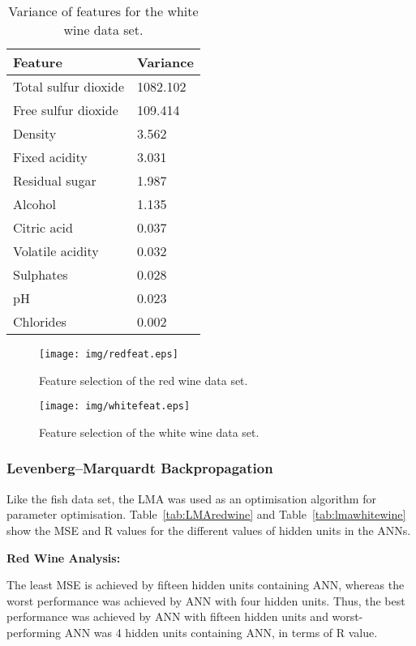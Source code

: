 \begin{table}[htbp]
    
    \centering
    \caption{Variance of features for the white wine data set.}
    \label{tab:whitewinevar}
    \begin{tabular}{|l|l|}
    \hline
         \textbf{Feature} & \textbf{Variance}\\ \hline
Total sulfur dioxide & 1082.102 \\ \hline
Free sulfur dioxide & 109.414 \\ \hline
Density & 3.562 \\ \hline
Fixed acidity  & 3.031 \\ \hline
Residual sugar & 1.987 \\ \hline
Alcohol & 1.135 \\ \hline
Citric acid  & 0.037 \\ \hline
Volatile acidity  & 0.032 \\ \hline
Sulphates & 0.028 \\ \hline
pH & 0.023 \\ \hline
Chlorides & 0.002 \\ \hline
    \end{tabular}
    
\end{table}

\begin{figure}[htbp]
  \centering
\texttt{[image: img/redfeat.eps]}
  \caption{Feature selection of the red wine data set.}
  \label{fig:redfeat}
\end{figure}

\begin{figure}[htbp]
  \centering
\texttt{[image: img/whitefeat.eps]}
  \caption{Feature selection of the white wine data set.}
  \label{fig:whitefeat}
\end{figure}

\subsubsection{Levenberg--Marquardt Backpropagation}

Like the fish data set, the LMA was used as an optimisation algorithm for parameter optimisation. Table~\ref{tab:LMAredwine} and Table~\ref{tab:lmawhitewine} show the MSE and R values for the different values of hidden units in the ANNs.

\textbf{Red Wine Analysis:}

The least MSE is achieved by fifteen hidden units containing ANN, whereas the worst performance was achieved by ANN with four hidden units. Thus, the best performance was achieved by ANN with fifteen hidden units and worst-performing ANN was 4 hidden units containing ANN, in terms of R value. 

